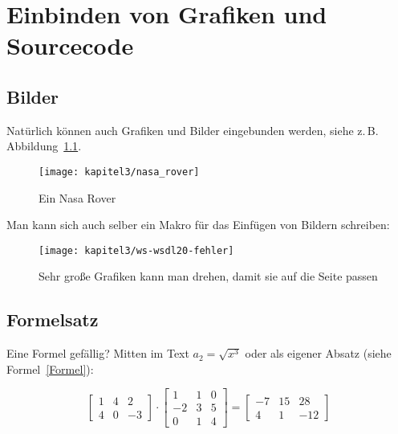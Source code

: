 \chapter{Einbinden von Grafiken und Sourcecode}
\label{Kap3}

\section{Bilder}

Natürlich können auch Grafiken und Bilder eingebunden werden, siehe z.\,B. Abbildung~\ref{Kap2:NasaRover}.

\begin{figure}[h]
  \centering
  \texttt{[image: kapitel3/nasa\_rover]}
  \caption{Ein Nasa Rover}
  \label{Kap2:NasaRover}
\end{figure}


Man kann sich auch selber ein Makro für das Einfügen von Bildern schreiben:


\begin{sidewaysfigure}
 \texttt{[image: kapitel3/ws-wsdl20-fehler]}
  \caption{Sehr große Grafiken kann man drehen, damit sie auf die Seite passen}
  \label{Kap2:wsdl-fehler}
\end{sidewaysfigure}


\clearpage %

\section{Formelsatz}

Eine Formel gefällig? Mitten im Text $a_2 = \sqrt{x^3}$ oder als eigener Absatz (siehe Formel~\ref{Formel}):

\begin{equation}
\begin{bmatrix}         
   1 &  4 &  2 \\
   4 &  0 & -3 
\end{bmatrix}        
        \cdot
\begin{bmatrix}                
   1 &  1 &  0 \\
  -2 &  3 &  5 \\
   0 &  1 &  4 
\end{bmatrix}        
       {=} 
\begin{bmatrix}               
  -7 &  15 &  28 \\
   4 &   1 & -12 
\end{bmatrix}
\label{Formel}
\end{equation}


